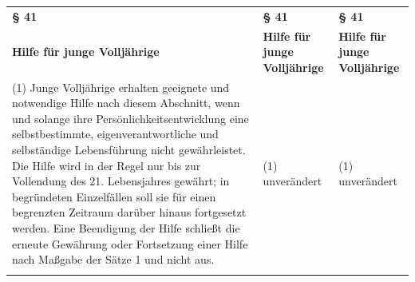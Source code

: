 \documentclass[10pt,a4paper,landscape]{article}
\begin{document}
\begin{longtable}{|L{8.2cm}|L{8.2cm}|L{8.2cm}|}
\hhline{|---|}
\textbf{\S{} 41} & \textbf{\S{} 41} & \textbf{\S{} 41} \\
\hhline{|---|}
\textbf{Hilfe für junge Volljährige} & \textbf{Hilfe für junge Volljährige} & \textbf{Hilfe für junge Volljährige} \\
\hhline{|---|}
(1) Junge Volljährige erhalten geeignete  \newline und notwendige Hilfe nach diesem  \newline Abschnitt, wenn und solange ihre  \newline Persönlichkeitsentwicklung eine  \newline selbstbestimmte, eigenverantwortliche und  \newline selbständige Lebensführung nicht  \newline gewährleistet. Die Hilfe wird in der Regel  \newline nur bis zur Vollendung des 21.  \newline Lebensjahres gewährt; in begründeten  \newline Einzelfällen soll sie für einen begrenzten  \newline Zeitraum darüber hinaus fortgesetzt  \newline werden. Eine Beendigung der Hilfe schließt  \newline die erneute Gewährung oder Fortsetzung  \newline einer Hilfe nach Maßgabe der Sätze 1 und   nicht aus. & (1) unverändert & (1) unverändert \\
\hhline{|---|}

\end{longtable}
\end{document}
